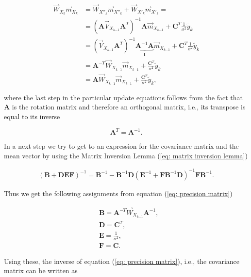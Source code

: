 \documentclass[11pt,a4paper,twoside]{report}
\newcommand{\messF}[3]{\overrightarrow{#1}_{{#2}_{k{#3}}}}
\newcommand{\mat}[1]{\mathbf{#1}}
\begin{document}
\begin{align}
  \label{eq: weighted mean}
  \messF{W}{X}{}\messF{m}{X}{} &= \messF{W}{X''}{}\messF{m}{X''}{} + \messF{W}{X'}{}\messF{m}{X'}{} = \\
  &= \left(\mat{A}\messF{V}{X}{-1}\mat{A}^T\right)^{-1}\mat{A}\messF{m}{X}{-1} + \mat{C}^T\frac{1}{\sigma^2}\tilde{y}_k \\
  &= \left(\messF{V}{X}{-1}\mat{A}^T\right)^{-1}\underbrace{\mat{A}^{-1}\mat{A}}_{\mat{I}}\messF{m}{X}{-1} + \mat{C}^T\frac{1}{\sigma^2}\tilde{y}_k \\
  &= \mat{A}^{-T}\messF{W}{X}{-1}\messF{m}{X}{-1} + \frac{\mat{C}^T}{\sigma^2}\tilde{y}_k \\
  &= \mat{A}\messF{W}{X}{-1}\messF{m}{X}{-1} + \frac{\mat{C}^T}{\sigma^2}\tilde{y}_k,
\end{align}

where the last step in the particular update equations follows from the fact that $\mat{A}$ is the rotation matrix and therefore an orthogonal matrix, i.e., its transpose is equal to its inverse

\begin{equation*}
	\mat{A}^T = \mat{A}^{-1}.
\end{equation*}

In a next step we try to get to an expression for the covariance matrix and the mean vector by using the Matrix Inversion Lemma (\ref{eq: matrix inversion lemma})
 
\begin{align}
	\label{eq: matrix inversion lemma}
	\left(\mat{B} + \mat{DEF}\right)^{-1} = \mat{B}^{-1} - \mat{B}^{-1}\mat{D}\left(\mat{E}^{-1} + \mat{F}\mat{B}^{-1}\mat{D}\right)^{-1}\mat{F}\mat{B}^{-1}.
\end{align}

\noindent Thus we get the following assignments from equation (\ref{eq: precision matrix})

\begin{align}
	\label{eq: assignments MIL}
	& \mat{B} = \mat{A}^{-T}\messF{W}{X}{-1}\mat{A}^{-1}, \\
	& \mat{D} = \mat{C}^T, \\
	& \mat{E} = \frac{1}{\sigma^2}, \\
	& \mat{F} = \mat{C}.
\end{align}

Using these, the inverse of equation (\ref{eq: precision matrix}), i.e., the covariance matrix can be written as
\end{document}
